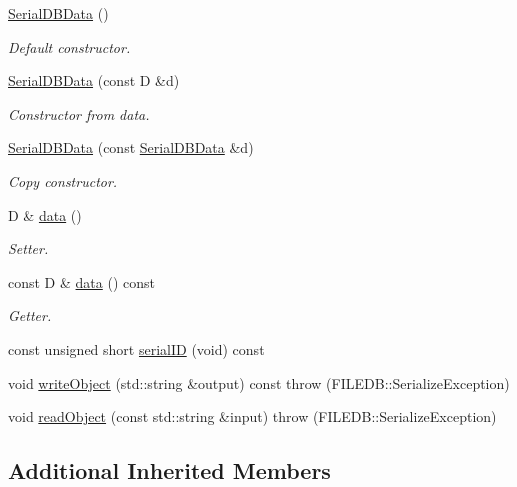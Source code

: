 \begin{DoxyCompactItemize}
\item 
\mbox{\hyperlink{classADATIO_1_1SerialDBData_a07279a443371f31d9e0ef857fab17fa5}{Serial\+D\+B\+Data}} ()
\begin{DoxyCompactList}\small\item\em Default constructor. \end{DoxyCompactList}\item 
\mbox{\hyperlink{classADATIO_1_1SerialDBData_afe5b91aca4221cfce681c85498a46f0c}{Serial\+D\+B\+Data}} (const D \&d)
\begin{DoxyCompactList}\small\item\em Constructor from data. \end{DoxyCompactList}\item 
\mbox{\hyperlink{classADATIO_1_1SerialDBData_a740c06f0022817ca9c071d186d7b3e92}{Serial\+D\+B\+Data}} (const \mbox{\hyperlink{classADATIO_1_1SerialDBData}{Serial\+D\+B\+Data}} \&d)
\begin{DoxyCompactList}\small\item\em Copy constructor. \end{DoxyCompactList}\item 
D \& \mbox{\hyperlink{classADATIO_1_1SerialDBData_af4a3864baddbecbc6177f164f8a1f664}{data}} ()
\begin{DoxyCompactList}\small\item\em Setter. \end{DoxyCompactList}\item 
const D \& \mbox{\hyperlink{classADATIO_1_1SerialDBData_a5532be95ec6214348c087afd8b2ff683}{data}} () const
\begin{DoxyCompactList}\small\item\em Getter. \end{DoxyCompactList}\item 
const unsigned short \mbox{\hyperlink{classADATIO_1_1SerialDBData_a513643be38434a570d655602330aade9}{serial\+ID}} (void) const
\item 
void \mbox{\hyperlink{classADATIO_1_1SerialDBData_a5266e4f1c065f0776f9974d6fad51a2f}{write\+Object}} (std\+::string \&output) const  throw (\+F\+I\+L\+E\+D\+B\+::\+Serialize\+Exception)
\item 
void \mbox{\hyperlink{classADATIO_1_1SerialDBData_a2f7405b96f413b1787fc2072b8932c20}{read\+Object}} (const std\+::string \&input)  throw (\+F\+I\+L\+E\+D\+B\+::\+Serialize\+Exception)
\end{DoxyCompactItemize}
\subsection*{Additional Inherited Members}


